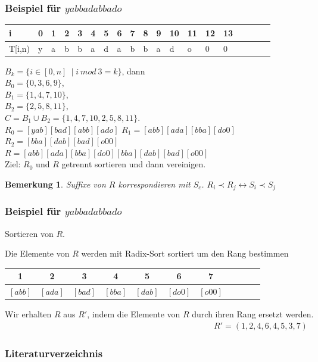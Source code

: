 \documentclass{beamer}
\newtheorem{remark}{Bemerkung}
\begin{document}
\begin{frame}[fragile]
\frametitle{Beispiel für $yabbadabbado$}
\begin{table}
\begin{tabular}{l|l l l l l l l l l l l l l level}
    \toprule
    i & 0 & 1 & 2 & 3 & 4 & 5 & 6 & 7 & 8 & 9 & 10 & 11 & 12 & 13 \\
    \midrule
    T[i,n) & y & a & b & b & a & d & a & b & b & a & d & o & 0 & 0  \\
    \bottomrule
\end{tabular}
\end{table}
$B_k = \{ i \in [0,n]\ \mid i \: mod \: 3 = k \}$, dann \\
$B_0 = \{0, 3, 6, 9 \}$,                                \\
$B_1 = \{1, 4, 7, 10 \}$,                               \\
$B_2 = \{2, 5, 8, 11 \}$,                               \\
\medskip
$C   = B_1 \cup B_2 = \{1, 4, 7, 10, 2, 5, 8, 11\}$.    \\
\medskip
$R_0 = [yab][bad][abb][ado]$
$R_1 = [abb][ada][bba][do0]$                            \\
$R_2 = [bba][dab][bad][o00]$                            \\
\medskip
$R   = [abb][ada][bba][do0][bba][dab][bad][o00]$        \\
\medskip
Ziel: $R_0$ und $R$ getrennt sortieren und dann vereinigen.
\begin{remark}
Suffixe von $R$ korrespondieren mit $S_c$. $R_i \prec R_j \leftrightarrow S_i \prec S_j$
\end{remark}
\end{frame}

\begin{frame}[fragile]
\frametitle{Beispiel für $yabbadabbado$}
\begin{description}[l]
    \item[Schritt 1:] Sortieren von $R$.
\end{description}
Die Elemente von $R$ werden mit Radix-Sort sortiert um den Rang bestimmen
\begin{table}
\begin{tabular}{c c c c c c c c c c c}
    \toprule
    1 & 2 & 3 & 4 & 5 & 6 & 7                                           \\
    \midrule
    $[abb]$ & $[ada]$ & $[bad]$ & $[bba]$ & $[dab]$ & $[do0]$ & $[o00]$ \\
    \bottomrule
\end{tabular}
\end{table}
Wir erhalten $R$ aus $R'$, indem die Elemente von $R$ durch ihren Rang ersetzt werden.
\begin{gather*}
    R' = (1,2,4,6,4,5,3,7)
\end{gather*}
\end{frame}

\begin{frame}[allowframebreaks]
\frametitle{Literaturverzeichnis}
\nocite{*}

\end{frame}
\end{document}
